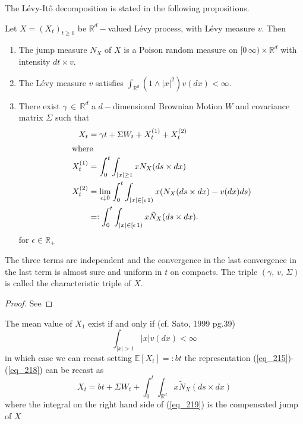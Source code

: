 The L\'evy-It\^o decomposition is stated in the following propositions.
\begin{proposition} \label{levy_Ito_decop}
Let $X = (X_t)_{t\geq0}$ be $\mathbb{R}^d-$valued L\'evy process, with L\'evy measure $v$. Then 
\begin{enumerate}
    \item The jump measure $N_X$ of $X$ is a Poison random measure on $[0 \, \infty) \times \mathbb{R}^d$ with intensity $dt \times v$.
    \item The L\'evy measure $v$ satisfies $\int_{\mathbb{R}^d} (1 \land |x|^2)  v(dx)< \infty$.
    \item There exist $\gamma \, \in \, \mathbb{R}^d$ a $d-$dimensional Brownian Motion $W$ and covariance matrix $\Sigma$ such that 
    \begin{align}
         X_t &= \gamma t + \Sigma W_t + X^{(1)}_t + X^{(2)}_t \label{eq_215} \\ 
         \intertext{where}
        X^{(1)}_t &= \int_0^t \int_{|x| \geq 1} x N_X (ds \times dx)  \label{eq_216} \\ 
        X^{(2)}_t &= \lim_{\epsilon \downarrow 0} \int_0^t \int_{|x| \in [\epsilon \, 1)} x (N_X (ds \times dx) - v (dx)ds) \label{eq_217} \\ 
        &=:  \int_0^t \int_{|x| \in [\epsilon \, 1)} x \tilde{N}_X (ds \times dx). \label{eq_218}
     \end{align}
     for $\epsilon \in \mathbb{R}_+ $
\end{enumerate}
The three terms are independent and the convergence in the last convergence in the last term is almost sure and uniform in $t$ on compacts. The triple $( \gamma,\, v,\, \Sigma)$ is called the characteristic triple of $X$.
\end{proposition}
\begin{proof}
See 
\end{proof}
\begin{remark}
The mean value of $X_1$ exist if and only if (cf. Sato, 1999 pg.39) $$\int_{|x| > 1}  |x| v(dx)< \infty$$ in which case we can recast setting $\mathbb{E}[X_t]=: bt$ the representation (\ref{eq_215})-(\ref{eq_218}) can be recast as 
\begin{equation}\label{eq_219}
    X_t = bt + \Sigma W_t + \int_0^t \int_{\mathbb{R}^d} x \tilde{N}_X (ds \times dx)
\end{equation}
where the integral on the right hand side of (\ref{eq_219}) is the compensated jump of $X$
\end{remark}

